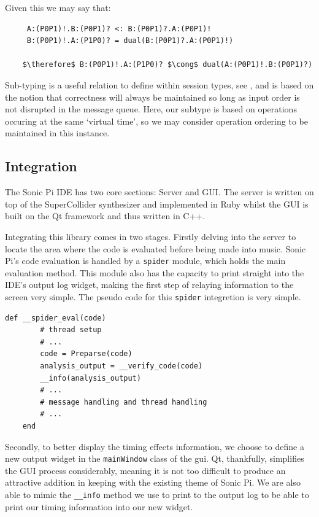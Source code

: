 \documentclass[11pt, abstracton, twoside, titlepage=true]{scrartcl}
\def\therefore{
	\leavevmode
	\lower0.4ex\hbox{$\cdot$}
	\kern-.5em\raise0.7ex\hbox{$\cdot$}
	\kern-0.55em\lower0.4ex\hbox{$\cdot$}
	\thinspace
}
\begin{document}
Given this we may say that:
\\
\begin{lstlisting}
     A:(P0P1)!.B:(P0P1)? <: B:(P0P1)?.A:(P0P1)!
     B:(P0P1)!.A:(P1P0)? = dual(B:(P0P1)?.A:(P0P1)!)

    $\therefore$ B:(P0P1)!.A:(P1P0)? $\cong$ dual(A:(P0P1)!.B:(P0P1)?)
\end{lstlisting}

Sub-typing is a useful relation to define within session types, see 
\cite{HYC08, MY15, MYH09}, and is based on the notion that correctness will 
always be maintained so long as input order is not disrupted in the message 
queue. Here, our subtype is based on operations occuring at the same `virtual 
time', so we may consider operation ordering to be maintained in this instance. 

\subsection{Integration}

The Sonic Pi IDE has two core sections: Server and GUI. The server is written on 
top of the SuperCollider synthesizer and implemented in Ruby whilst the GUI is 
built on the Qt framework and thus written in C++.

Integrating this library comes in two stages. Firstly delving into the server to 
locate the area where the code is evaluated before being made into music. Sonic 
Pi's code evaluation is handled by a \texttt{spider} module, which holds the main 
evaluation method. This module also has the capacity to print straight into the 
IDE's output log widget, making the first step of relaying information to the 
screen very simple. The pseudo code for this \texttt{spider} integretion is very
simple.
\\
\begin{lstlisting}[style = sonicpi]
    def __spider_eval(code)
        # thread setup
        # ...
        code = Preparse(code)
        analysis_output = __verify_code(code)
        __info(analysis_output)
        # ...
        # message handling and thread handling
        # ...
    end
\end{lstlisting}

Secondly, to better display the timing effects information, we choose to define 
a new output widget in the \texttt{mainWindow} class of the gui. Qt, thankfully, 
simplifies the GUI process considerably, meaning it is not too difficult to produce
an attractive addition in keeping with the existing theme of Sonic Pi. We are 
also able to mimic the \texttt{\_\_info} method we use to print to the output log
to be able to print our timing information into our new widget.
\end{document}
